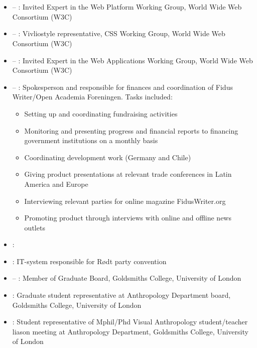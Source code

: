 \section*{\organizationexperience}

\begin{itemize}
\item {} – : Invited Expert in the Web Platform Working Group, World Wide Web Consortium (W3C)
\item {} – : Vivliostyle representative, CSS Working Group, World Wide Web Consortium (W3C)
\item {} –  : Invited Expert in the Web Applications Working Group, World Wide Web Consortium (W3C)
\item {} – : Spokesperson and responsible for finances and coordination of Fidus Writer/Open Academia Foreningen. Tasks included:
\begin{itemize}
\item Setting up and coordinating fundraising activities
\item Monitoring and presenting progress and financial reports to financing government institutions on a monthly basis
\item Coordinating development work (Germany and Chile)
\item Giving product presentations at relevant trade conferences in Latin America and Europe
\item Interviewing relevant parties for online magazine FidusWriter.org
\item Promoting product through interviews with online and offline news outlets
\end{itemize}
\item {}: 
\item {}: IT-system responsible for Rødt party convention
\item {} –  : Member of Graduate Board, Goldsmiths College, University of London
\item {}: Graduate student representative at Anthropology Department board, Goldsmiths College, University of London
\item {}: Student representative of Mphil/Phd Visual Anthropology student/teacher liason meeting at Anthropology Department, Goldsmiths College, University of London

\end{itemize}

